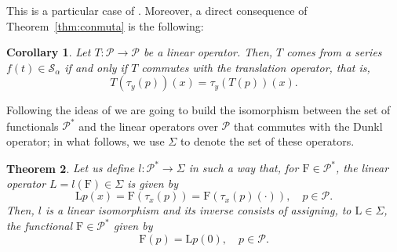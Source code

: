 \documentclass[11pt]{article}
\theoremstyle{plain}
\newtheorem{theorem}{Theorem}[section]
\newtheorem{corollary}[theorem]{Corollary}
\theoremstyle{remark}
\numberwithin{equation}{section} %
\newcommand{\La}{\Lambda_{\alpha}}
\newcommand{\binoma}[2]{\binom{#1}{#2}_{\!\alpha}}
\newcommand{\calP}{\mathcal{P}}
\newcommand{\Sa}{\mathcal{S}_{\alpha}}
\newcommand{\FF}{\mathrm{F}}
\newcommand{\LL}{\mathrm{L}}
\begin{document}
%

This is a particular case of \cite[Proposition~4.1]{RomV1}. Moreover, a direct consequence of Theorem~\ref{thm:conmuta} is the following:

\begin{corollary}
\label{cor:conmuta}
Let $T : \calP \to \calP$ be a linear operator. Then, $T$ comes from a series $f(t) \in \Sa$ if and only if $T$ commutes with the translation operator, that is,
\[
T(\tau_y(p))(x) = \tau_y(T(p))(x).
\]
\end{corollary}

Following the ideas of \cite{CH} we are going to build the isomorphism between the set of functionals $\calP^*$ and the linear operators over $\calP$ that commutes with the Dunkl operator; in what follows, we use $\Sigma$ to denote the set of these operators.


\begin{theorem}
\label{thm:isomor}
Let us define $l : \calP^* \longrightarrow \Sigma$ in such a way that, for $\FF \in \calP^*$, the linear operator $L = l(\FF) \in \Sigma$ is given by
\[
\LL p(x) = \FF(\tau_x(p)) = \FF(\tau_x(p)(\cdot)),\quad p \in \calP.
\]
Then, $l$ is a linear isomorphism and its inverse consists of assigning, to $\LL \in \Sigma$, the functional $\FF \in \calP^*$ given by
\[
\FF(p) = \LL p(0), \quad p \in \calP.
\]
\end{theorem}
\end{document}

